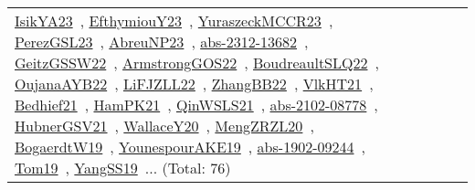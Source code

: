 {\begin{longtable}{lp{3cm}>{\raggedright\arraybackslash}p{6cm}>{\raggedright\arraybackslash}p{6cm}>{\raggedright\arraybackslash}p{8cm}}
\href{works/IsikYA23.pdf}{IsikYA23}~\cite{IsikYA23}, \href{works/EfthymiouY23.pdf}{EfthymiouY23}~\cite{EfthymiouY23}, \href{works/YuraszeckMCCR23.pdf}{YuraszeckMCCR23}~\cite{YuraszeckMCCR23}, \href{works/PerezGSL23.pdf}{PerezGSL23}~\cite{PerezGSL23}, \href{works/AbreuNP23.pdf}{AbreuNP23}~\cite{AbreuNP23}, \href{works/abs-2312-13682.pdf}{abs-2312-13682}~\cite{abs-2312-13682}, \href{works/GeitzGSSW22.pdf}{GeitzGSSW22}~\cite{GeitzGSSW22}, \href{works/ArmstrongGOS22.pdf}{ArmstrongGOS22}~\cite{ArmstrongGOS22}, \href{works/BoudreaultSLQ22.pdf}{BoudreaultSLQ22}~\cite{BoudreaultSLQ22}, \href{works/OujanaAYB22.pdf}{OujanaAYB22}~\cite{OujanaAYB22}, \href{works/LiFJZLL22.pdf}{LiFJZLL22}~\cite{LiFJZLL22}, \href{works/ZhangBB22.pdf}{ZhangBB22}~\cite{ZhangBB22}, \href{works/VlkHT21.pdf}{VlkHT21}~\cite{VlkHT21}, \href{works/Bedhief21.pdf}{Bedhief21}~\cite{Bedhief21}, \href{works/HamPK21.pdf}{HamPK21}~\cite{HamPK21}, \href{works/QinWSLS21.pdf}{QinWSLS21}~\cite{QinWSLS21}, \href{works/abs-2102-08778.pdf}{abs-2102-08778}~\cite{abs-2102-08778}, \href{works/HubnerGSV21.pdf}{HubnerGSV21}~\cite{HubnerGSV21}, \href{works/WallaceY20.pdf}{WallaceY20}~\cite{WallaceY20}, \href{works/MengZRZL20.pdf}{MengZRZL20}~\cite{MengZRZL20}, \href{works/BogaerdtW19.pdf}{BogaerdtW19}~\cite{BogaerdtW19}, \href{works/YounespourAKE19.pdf}{YounespourAKE19}~\cite{YounespourAKE19}, \href{works/abs-1902-09244.pdf}{abs-1902-09244}~\cite{abs-1902-09244}, \href{works/Tom19.pdf}{Tom19}~\cite{Tom19}, \href{works/YangSS19.pdf}{YangSS19}~\cite{YangSS19}... (Total: 76)\\

\end{longtable}}
